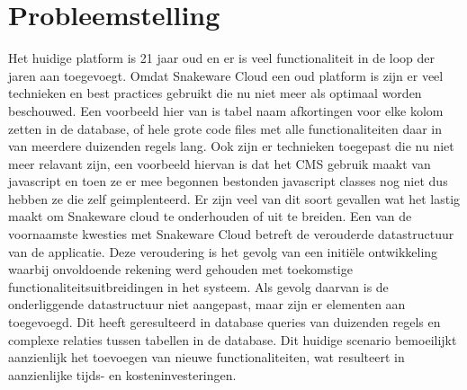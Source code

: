 \section{Probleemstelling}
{}
Het huidige platform is 21 jaar oud en er is veel functionaliteit in de loop der jaren aan toegevoegt.
Omdat Snakeware Cloud een oud platform is zijn er veel technieken en best practices gebruikt die nu niet meer als optimaal worden beschouwed.
Een voorbeeld hier van is tabel naam afkortingen voor elke kolom zetten in de database, of hele grote code files met alle functionaliteiten daar in van meerdere duizenden regels lang. 
Ook zijn er technieken toegepast die nu niet meer relavant zijn, een voorbeeld hiervan is dat het \gls{CMS} gebruik maakt van javascript en toen ze er mee begonnen bestonden javascript classes nog niet dus hebben ze die zelf geimplenteerd.
Er zijn veel van dit soort gevallen wat het lastig maakt om Snakeware cloud te onderhouden of uit te breiden.
\whitespace
Een van de voornaamste kwesties met Snakeware Cloud betreft de verouderde datastructuur van de applicatie.
Deze veroudering is het gevolg van een initiële ontwikkeling waarbij onvoldoende rekening werd gehouden met toekomstige functionaliteitsuitbreidingen in het systeem.
Als gevolg daarvan is de onderliggende datastructuur niet aangepast, maar zijn er elementen aan toegevoegd.
Dit heeft geresulteerd in database queries van duizenden regels en complexe relaties tussen tabellen in de database.
Dit huidige scenario bemoeilijkt aanzienlijk het toevoegen van nieuwe functionaliteiten, wat resulteert in aanzienlijke tijds- en kosteninvesteringen.
